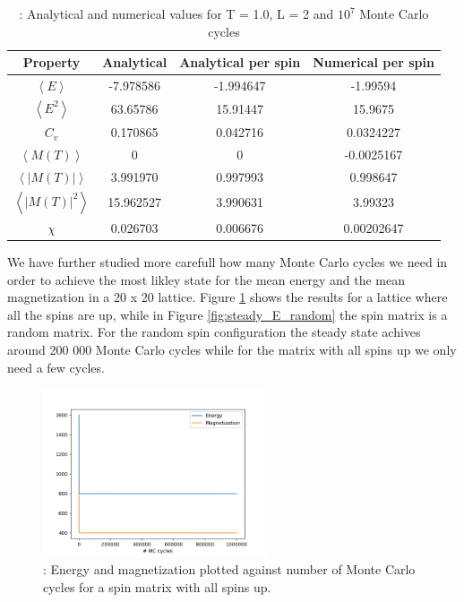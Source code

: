 \documentclass{article}
\begin{document}
{\renewcommand{\arraystretch}{1.5}
\begin{table}[h!]
  \caption{: Analytical and numerical values for T = 1.0, L = 2 and $10^7$ Monte Carlo cycles }
    \label{Tab: values}
    \centering
  \begin{tabular}{c c c c}
    Property & Analytical & Analytical per spin & Numerical per spin \\
    \hline
    $\left<E\right>$ & -7.978586  & -1.994647 & -1.99594\\
    $\left<E^2\right>$ & 63.65786 & 15.91447 &15.9675 \\
    $C_v$ & 0.170865 & 0.042716 & 0.0324227 \\
    $\left<M(T)\right>$  & 0 & 0 & -0.0025167\\
    $\left<|M(T)|\right>$ & 3.991970 & 0.997993 & 0.998647 \\
    $\left<|M(T)|^2\right> $ & 15.962527 & 3.990631 & 3.99323\\
    $\chi$ & 0.026703 & 0.006676 & 0.00202647\\
  \end{tabular}
\end{table}

We have further studied more carefull how many Monte Carlo cycles we need in order to achieve the most likley state for the mean energy and the mean magnetization in a 20 x 20 lattice. Figure \ref{fig:steady_E} shows the results for a lattice where all the spins are up, while in Figure \ref{fig:steady_E_random} the spin matrix is a random matrix. For the random spin configuration the steady state achives around 200 000 Monte Carlo cycles while for the matrix with all spins up we only need a few cycles.

\begin{figure}[hbt]
\begin{center}
    \includegraphics[width=250px]{./plot/L20_1mill.png}
    \caption{: Energy and magnetization plotted against number of Monte Carlo cycles for a spin matrix with all spins up.}
    \label{fig:steady_E}
\end{center}
\end{figure}

}
\end{document}
